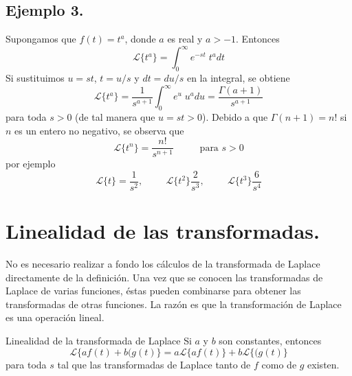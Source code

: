 \subsection*{Ejemplo 3.}
Supongamos que $f(t) = t^{a}$, donde $a$ es real y $a > -1$. Entonces
\[ \mathscr{L} \{ t^{a} \} = \int_{0}^{\infty} e^{-st} \; t^{a} dt \]
Si sustituimos $u = st$, $t =  u/s$ y $dt = du/s$ en la integral, se obtiene
\begin{equation}
\mathscr{L} \{ t^{a} \} =  \dfrac{1}{s^{a+1}} \int_{0}^{\infty} e^{u} \; u^{a} du = \dfrac{\Gamma(a + 1)}{s^{a + 1}}
\label{eq:010}
\end{equation}
para toda $s > 0$ (de tal manera que $u = st > 0$). Debido a que $\Gamma(n+1) = n!$ si $n$ es un entero no negativo, se observa que
\begin{equation}
\mathscr{L} \{ t^{n} \} = \dfrac{n!}{s^{n+1}} \hspace{1cm} \mbox{ para } s > 0
\label{eq:011}
\end{equation}
por ejemplo
\[ \mathscr{L} \{ t \} = \dfrac{1}{s^{2}}, \hspace{1cm} \mathscr{L} \{ t^{2} \} \dfrac{2}{s^{3}}, \hspace{1cm} \mathscr{L} \{ t^{3} \} \dfrac{6}{s^{4}} \]
\section{Linealidad de las transformadas.}
No es necesario realizar a fondo los cálculos de la transformada de Laplace directamente de la definición. Una vez que se conocen las transformadas de Laplace de varias funciones, éstas pueden combinarse para obtener las transformadas de otras funciones. La razón es que la transformación de Laplace es una operación lineal.
\begin{teo}{Linealidad de la transformada de Laplace}
Si $a$ y $b$ son constantes, entonces
\begin{equation}
\mathscr{L} \{ a f(t) +  b (g(t) \} = a \mathscr{L} \{ a f(t) \} + b \mathscr{L} \{ (g(t) \}
\label{eq:012}
\end{equation}
para toda $s$ tal que las transformadas de Laplace tanto de $f$ como de $g$ existen.
\end{teo}
